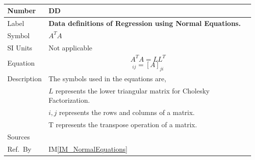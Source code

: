 \documentclass[12pt]{article}
\newcommand{\colAwidth}{0.13\textwidth}
\newcommand{\colBwidth}{0.82\textwidth}
\newcounter{defnum} %
\newcounter{datadefnum} %
\newcommand{\iref}[1]{IM\ref{#1}}
\begin{document}
~\newline
\noindent
\begin{minipage}{\textwidth}
	\renewcommand*{\arraystretch}{1.5}
	\begin{tabular}{| p{\colAwidth} | p{\colBwidth}|}
		\hline
		\rowcolor[gray]{0.9}
		Number
		& DD{datadefnum}\thedatadefnum \label{DD_NormalEquations}\\
		\hline
		
		Label
		& \bf Data definitions of Regression using Normal Equations.\\
		\hline
		
		Symbol 
		&$A^{T} A$\\
		\hline
		
		SI Units 
		& Not applicable\\
		\hline
		
		Equation
		&
		\begin{equation*}
		A^{T} A = L L^{T}
		\end{equation*}
		\begin{equation*}
		[A^{T}]_{ij} = [A]_{ji}
		\end{equation*}\\
		\hline
		
		Description 
		&The symbols used in the equations are,\\ 
		& $L$ represents the lower triangular matrix for Cholesky Factorization.\\
		& $i, j$ represents the rows and columns of a matrix.\\
		& T represents the transpose operation of a matrix.\\
		
		\hline
		
		Sources
		& ~\cite{Health1997}\\
		\hline
		
		Ref.\ By 
		& \iref{IM_NormalEquations}\\
		\hline
		
	\end{tabular}
\end{minipage}\\
\end{document}
